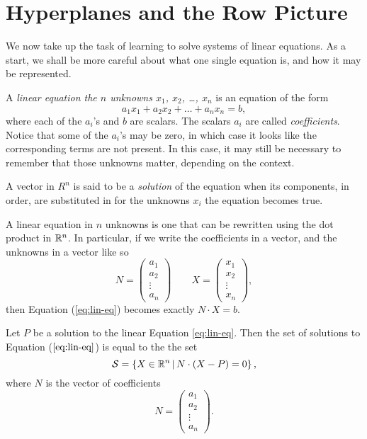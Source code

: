 \documentclass[elementsmain.tex]{subfiles}
\begin{document}
\section{Hyperplanes and the Row Picture}

We now take up the task of learning to solve systems of linear equations. As a start, we shall be more careful about what one single equation is, and how it may be represented.

\begin{definition} A \emph{linear equation the $n$ unknowns $x_1$, $x_2$, \dots, $x_n$} is an equation of the form
\begin{equation}\label{eq:lin-eq}
a_1 x_1 + a_2 x_2 + \dots + a_n x_n = b,
\end{equation}
where each of the $a_i$'s and $b$ are scalars. The scalars $a_i$ are called \emph{coefficients}. Notice that some of the $a_i$'s may be zero, in which case it looks like the corresponding terms are not present. In this case, it may still be necessary to remember that those unknowns matter, depending on the context.

A vector in $R^n$ is said to be a \emph{solution} of the equation when its components, in order, are substituted in for the unknowns $x_i$ the equation becomes true.
\end{definition}


\begin{remark} A linear equation in $n$ unknowns is one that can be rewritten
using the dot product in $\mathbb{R}^n$. In particular, if we write the coefficients in a vector, and the unknowns in a vector like so
\[
N = \begin{pmatrix} a_1 \\ a_2 \\ \vdots \\ a_n\end{pmatrix} \qquad
X = \begin{pmatrix} x_1 \\ x_2 \\ \vdots \\ x_n\end{pmatrix},
\]
then Equation (\ref{eq:lin-eq}) becomes exactly $N\cdot X = b$.
\end{remark} 

\begin{theorem} Let $P$ be a solution to the linear Equation \ref{eq:lin-eq}. 
Then the set of solutions to Equation ($\ref{eq:lin-eq}$) is equal to the the set
\[
\mathcal{S} = \left\{ X\in \mathbb{R}^n \,\middle|\, N \cdot (X- P) = 0 \right\},
\]
where $N$ is the vector of coefficients
\[
N = \begin{pmatrix} a_1 \\ a_2 \\ \vdots \\ a_n\end{pmatrix}.
\]
\end{theorem}
\end{document}
